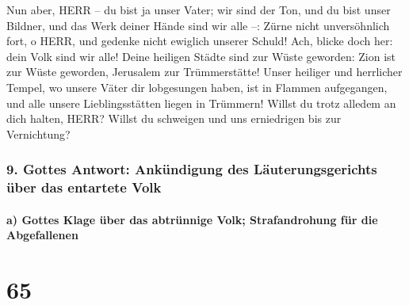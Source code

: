 Nun aber, HERR -- du bist ja unser Vater; wir sind der
Ton, und du bist unser Bildner, und das Werk deiner Hände sind wir alle
--: Zürne nicht unversöhnlich fort, o HERR, und gedenke
nicht ewiglich unserer Schuld! Ach, blicke doch her: dein Volk sind wir
alle! Deine heiligen Städte sind zur Wüste geworden: Zion
ist zur Wüste geworden, Jerusalem zur Trümmerstätte!
Unser heiliger und herrlicher Tempel, wo unsere Väter dir
lobgesungen haben, ist in Flammen aufgegangen, und alle unsere
Lieblingsstätten liegen in Trümmern! Willst du trotz
alledem an dich halten, HERR? Willst du schweigen und uns erniedrigen
bis zur Vernichtung?

\hypertarget{gottes-antwort-ankuxfcndigung-des-luxe4uterungsgerichts-uxfcber-das-entartete-volk}{%
\subsubsection{9. Gottes Antwort: Ankündigung des Läuterungsgerichts
über das entartete
Volk}\label{gottes-antwort-ankuxfcndigung-des-luxe4uterungsgerichts-uxfcber-das-entartete-volk}}

\hypertarget{a-gottes-klage-uxfcber-das-abtruxfcnnige-volk-strafandrohung-fuxfcr-die-abgefallenen}{%
\paragraph{a) Gottes Klage über das abtrünnige Volk; Strafandrohung für
die
Abgefallenen}\label{a-gottes-klage-uxfcber-das-abtruxfcnnige-volk-strafandrohung-fuxfcr-die-abgefallenen}}

\hypertarget{section-64}{%
\section{65}\label{section-64}}

